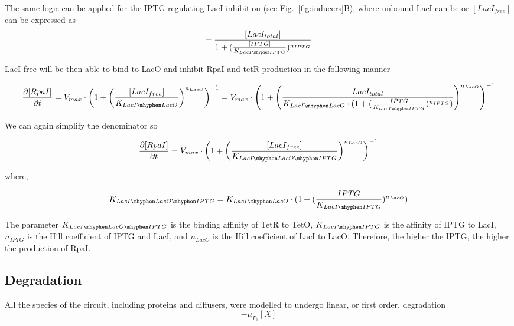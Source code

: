 The same logic can be applied for the IPTG regulating LacI inhibition (see Fig.~\ref{fig:inducers}B), where unbound LacI can be or $[LacI_{free}]$ can be expressed as
\begin{equation}
[LacI{free}] =  \frac{[LacI_{total}]}{1+(\frac{[IPTG]}{K_{LacI \mhyphen IPTG}})^{n_{IPTG}}}
\end{equation}

LacI free will be then able to bind to LacO and inhibit RpaI and tetR production in the following manner

\begin{equation}
    \pdv{[RpaI]}{t} = V_{max}\cdot \left(1+\left(\frac{[LacI_{free}]}{K_{LacI \mhyphen LacO}}\right)^{n_{LacO}}\right)^{-1} = V_{max} \cdot \left(1+\left(\frac{LacI_{total}}{K_{LacI \mhyphen LacO}\cdot(1+(\frac{IPTG}{K_{LacI \mhyphen IPTG}})^{n_{IPTG}})}\right)^{n_{LacO}}\right)^{-1}
\end{equation}


We can again simplify the denominator so

\begin{equation}
    \pdv{[RpaI]}{t} = V_{max}\cdot \left(1+\left(\frac{[LacI_{free}]}{K_{LacI \mhyphen LacO \mhyphen IPTG }}\right)^{n_{LacO}}\right)^{-1}
\end{equation}

where,

\begin{equation}
    K_{LacI \mhyphen LacO \mhyphen IPTG} = K_{LacI \mhyphen LacO}\cdot(1+(\frac{IPTG}{K_{LacI \mhyphen IPTG}})^{n_{LacO}})
\end{equation}

The parameter $K_{LacI \mhyphen LacO \mhyphen IPTG}$ is the binding affinity of TetR to TetO, $K_{LacI \mhyphen IPTG}$ is the affinity of IPTG to LacI, $n_{IPTG}$ is the Hill coefficient of IPTG and LacI, and $n_{LacO}$ is the Hill coefficient of LacI to LacO. Therefore, the higher the IPTG, the higher the production of RpaI.




\subsection{Degradation}
All the species of the circuit, including proteins and diffusers, were modelled to undergo linear, or first order, degradation
\begin{equation}
    -\mu_{P_{1}}[X]
    \label{linear degradation}
\end{equation}


